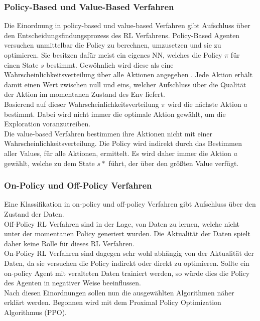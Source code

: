 \subsubsection{Policy-Based und Value-Based Verfahren} \label{subsubsec:Grundlagen_policy_value_based}
Die Einordnung in policy-based und value-based Verfahren gibt Aufschluss über den Entscheidungsfindungsprozess des RL Verfahrens.
Policy-Based Agenten versuchen unmittelbar die Policy zu berechnen, umzusetzen und sie zu optimieren. Sie besitzen dafür meist ein eigenes NN, welches die Policy $\pi$ für einen State $s$ bestimmt.
Gewöhnlich wird diese als eine Wahrscheinlichkeitsverteilung über alle Aktionen angegeben . Jede Aktion erhält damit einen Wert zwischen null und eins, welcher Aufschluss über die Qualität der Aktion im momentanen Zustand des Env liefert. \citep[S. 100]{DRL_Lapan} \\
Basierend auf dieser Wahrscheinlichkeitsverteilung $\pi$ wird die nächste Aktion $a$ bestimmt. Dabei wird nicht immer die optimale Aktion gewählt, um die Exploration voranzutreiben.\\
Die value-based Verfahren bestimmen ihre Aktionen nicht mit einer Wahrscheinlichkeitsverteilung. Die Policy wird indirekt durch das Bestimmen aller Values,  für alle Aktionen, ermittelt. Es wird daher immer die Aktion $a$ gewählt, welche zu dem State $s*$ führt, der über den größten Value verfügt. \citep[S. 100]{DRL_Lapan}

\subsubsection{On-Policy und Off-Policy Verfahren} \label{subsubsec:Grundlagen_on_off_policy}
Eine Klassifikation in on-policy und off-policy Verfahren gibt Aufschluss über den Zustand der Daten.\\ 
Off-Policy RL Verfahren sind in der Lage, von Daten zu lernen, welche nicht unter der momentanen Policy  generiert wurden. Die Aktualität der Daten spielt daher keine Rolle für dieses RL Verfahren.\\
On-Policy RL Verfahren sind dagegen sehr wohl abhängig von der Aktualität der Daten, da sie versuchen die Policy indirekt oder direkt zu optimieren. Sollte ein on-policy Agent mit veralteten Daten trainiert werden, so würde dies die Policy des Agenten in negativer Weise beeinflussen. \citep[S. 210 f.]{DRL_Lapan}\\
Nach diesen Einordnungen sollen nun die ausgewählten Algorithmen näher erklärt werden. Begonnen wird mit dem Proximal Policy Optimization Algorithmus (PPO).

